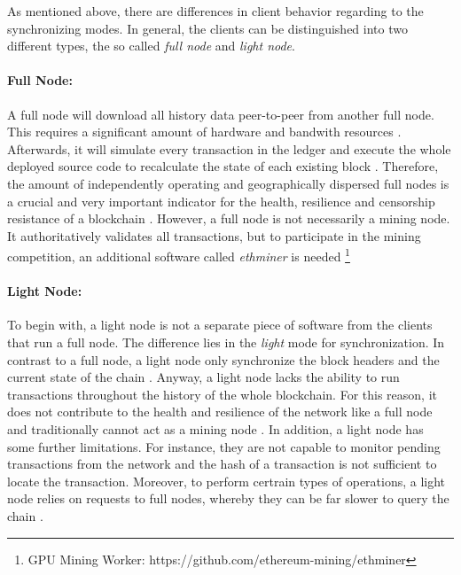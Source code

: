 As mentioned above, there are differences in client behavior regarding to the synchronizing modes. 
In general, the clients can be distinguished into two different types, the so called \textit{full node} and 
\textit{light node}. 

\paragraph{Full Node:} A full node will download all history data peer-to-peer from
another full node. This requires a significant amount of hardware and bandwith resources .
Afterwards, it will simulate every transaction in the ledger
and execute the whole deployed source code to recalculate the state of each existing block .
Therefore, the amount of independently operating and geographically dispersed full nodes 
is a crucial and very important indicator for the health, resilience and 
censorship resistance of a blockchain . 
However, a full node is not necessarily a mining node. It authoritatively validates all transactions, but 
to participate in the mining competition, an additional software called \textit{ethminer}
 is needed \footnote{GPU Mining Worker: https://github.com/ethereum-mining/ethminer}

\paragraph{Light Node:} To begin with, a light node is not a separate piece of software from the clients that 
run a full node. The difference lies in the \textit{light} mode for synchronization. 
In contrast to a full node, a light node only synchronize the block headers and the 
current state of the chain .
Anyway, a light node lacks the ability to run transactions throughout the history of the 
whole blockchain. For this reason, it does not contribute to the health and resilience of 
the network like a full node and traditionally cannot act as a mining node . 
In addition, a light node has some further limitations. For instance, they are not 
capable to monitor pending transactions from the network and the hash of a transaction
is not sufficient to locate the transaction. Moreover, to perform certrain types of operations,
a light node relies on requests to full nodes, whereby they can be far slower to query the chain .


